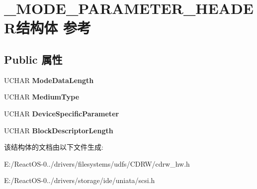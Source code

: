 \hypertarget{struct___m_o_d_e___p_a_r_a_m_e_t_e_r___h_e_a_d_e_r}{}\section{\+\_\+\+M\+O\+D\+E\+\_\+\+P\+A\+R\+A\+M\+E\+T\+E\+R\+\_\+\+H\+E\+A\+D\+E\+R结构体 参考}
\label{struct___m_o_d_e___p_a_r_a_m_e_t_e_r___h_e_a_d_e_r}
\subsection*{Public 属性}
\begin{DoxyCompactItemize}
\item 
\mbox{\label{struct___m_o_d_e___p_a_r_a_m_e_t_e_r___h_e_a_d_e_r_a2b10e17316712bdf0e02d5c9d152d4ba}} 
U\+C\+H\+AR {\bfseries Mode\+Data\+Length}
\item 
\mbox{\label{struct___m_o_d_e___p_a_r_a_m_e_t_e_r___h_e_a_d_e_r_afe54962eb71640f708d0ff1b911d93ec}} 
U\+C\+H\+AR {\bfseries Medium\+Type}
\item 
\mbox{\label{struct___m_o_d_e___p_a_r_a_m_e_t_e_r___h_e_a_d_e_r_a37f324d09d1329534e4547d12c3d832a}} 
U\+C\+H\+AR {\bfseries Device\+Specific\+Parameter}
\item 
\mbox{\label{struct___m_o_d_e___p_a_r_a_m_e_t_e_r___h_e_a_d_e_r_adb898aeadd2a7f8ef675c30312c9430b}} 
U\+C\+H\+AR {\bfseries Block\+Descriptor\+Length}
\end{DoxyCompactItemize}


该结构体的文档由以下文件生成\+:\begin{DoxyCompactItemize}
\item 
E\+:/\+React\+O\+S-\/0../drivers/filesystems/udfs/\+C\+D\+R\+W/cdrw\+\_\+hw.\+h\item 
E\+:/\+React\+O\+S-\/0../drivers/storage/ide/uniata/scsi.\+h\end{DoxyCompactItemize}
